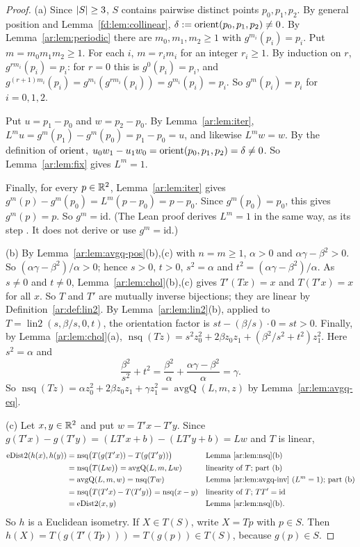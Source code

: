\begin{proof}
(a) Since $\lvert S\rvert\ge3$, $S$ contains pairwise distinct points $p_0,p_1,p_2$. By general position and
Lemma~\ref{fd:lem:collinear}, $\delta:=\operatorname{orient}(p_0,p_1,p_2)\ne0$. By Lemma~\ref{ar:lem:periodic} there are
$m_0,m_1,m_2\ge1$ with $g^{m_i}(p_i)=p_i$. Put $m=m_0m_1m_2\ge1$. For each $i$, $m=r_im_i$ for an integer $r_i\ge1$. By
induction on $r$, $g^{rm_i}(p_i)=p_i$: for $r=0$ this is $g^0(p_i)=p_i$, and
$g^{(r+1)m_i}(p_i)=g^{m_i}(g^{rm_i}(p_i))=g^{m_i}(p_i)=p_i$. So $g^m(p_i)=p_i$ for $i=0,1,2$.

Put $u=p_1-p_0$ and $w=p_2-p_0$. By Lemma~\ref{ar:lem:iter}, $L^mu=g^m(p_1)-g^m(p_0)=p_1-p_0=u$, and likewise
$L^mw=w$. By the definition of $\operatorname{orient}$, $u_0w_1-u_1w_0=\operatorname{orient}(p_0,p_1,p_2)=\delta\ne0$. So Lemma~\ref{ar:lem:fix}
gives $L^m=1$.

Finally, for every $p\in\mathbb R^2$, Lemma~\ref{ar:lem:iter} gives $g^m(p)-g^m(p_0)=L^m(p-p_0)=p-p_0$. Since
$g^m(p_0)=p_0$, this gives $g^m(p)=p$. So $g^m=\mathrm{id}$. (The Lean proof derives $L^m=1$ in the same way, as its
step . It does not derive or use $g^m=\mathrm{id}$.)

(b) By Lemma~\ref{ar:lem:avgq-pos}(b),(c) with $n=m\ge1$, $\alpha>0$ and $\alpha\gamma-\beta^2>0$. So
$(\alpha\gamma-\beta^2)/\alpha>0$; hence $s>0$, $t>0$, $s^2=\alpha$ and $t^2=(\alpha\gamma-\beta^2)/\alpha$. As $s\ne0$
and $t\ne0$, Lemma~\ref{ar:lem:chol}(b),(c) gives $T'(Tx)=x$ and $T(T'x)=x$ for all $x$. So $T$ and $T'$ are mutually
inverse bijections; they are linear by Definition~\ref{ar:def:lin2}. By Lemma~\ref{ar:lem:lin2}(b), applied to
$T=\operatorname{lin2}(s,\beta/s,0,t)$, the orientation factor is $st-(\beta/s)\cdot0=st>0$. Finally, by
Lemma~\ref{ar:lem:chol}(a),
$\operatorname{nsq}(Tz)=s^2z_0^2+2\beta z_0z_1+(\beta^2/s^2+t^2)z_1^2$. Here $s^2=\alpha$ and
\[
\frac{\beta^2}{s^2}+t^2=\frac{\beta^2}{\alpha}+\frac{\alpha\gamma-\beta^2}{\alpha}=\gamma .
\]
So $\operatorname{nsq}(Tz)=\alpha z_0^2+2\beta z_0z_1+\gamma z_1^2=\operatorname{avgQ}(L,m,z)$ by
Lemma~\ref{ar:lem:avgq-eq}.

(c) Let $x,y\in\mathbb R^2$ and put $w=T'x-T'y$. Since $g(T'x)-g(T'y)=(LT'x+b)-(LT'y+b)=Lw$ and $T$ is linear,
\begin{align*}
\operatorname{eDist2}(h(x),h(y))
&=\operatorname{nsq}\bigl(T(g(T'x))-T(g(T'y))\bigr) &&\text{Lemma~\ref{ar:lem:nsq}(b)}\\
&=\operatorname{nsq}\bigl(T(Lw)\bigr)=\operatorname{avgQ}(L,m,Lw) &&\text{linearity of $T$; part (b)}\\
&=\operatorname{avgQ}(L,m,w)=\operatorname{nsq}(Tw) &&\text{Lemma~\ref{ar:lem:avgq-inv} ($L^m=1$); part (b)}\\
&=\operatorname{nsq}\bigl(T(T'x)-T(T'y)\bigr)=\operatorname{nsq}(x-y) &&\text{linearity of $T$; $TT'=\mathrm{id}$}\\
&=\operatorname{eDist2}(x,y) &&\text{Lemma~\ref{ar:lem:nsq}(b).}
\end{align*}
So $h$ is a Euclidean isometry. If $X\in T(S)$, write $X=Tp$ with $p\in S$. Then $h(X)=T(g(T'(Tp)))=T(g(p))\in T(S)$,
because $g(p)\in S$.


\end{proof}
